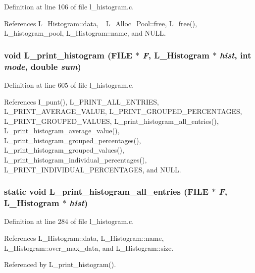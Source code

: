 Definition at line 106 of file l\_\-histogram.c.

References L\_\-Histogram::data, \_\-L\_\-Alloc\_\-Pool::free, L\_\-free(), L\_\-histogram\_\-pool, L\_\-Histogram::name, and NULL.
\subsubsection{\setlength{\rightskip}{0pt plus 5cm}void L\_\-print\_\-histogram (FILE $\ast$ {\em F}, \bf{L\_\-Histogram} $\ast$ {\em hist}, int {\em mode}, double {\em sum})}\label{l__histogram_8c_d6f17fb66a8bca281cb50d0a9778647e}




Definition at line 605 of file l\_\-histogram.c.

References I\_\-punt(), L\_\-PRINT\_\-ALL\_\-ENTRIES, L\_\-PRINT\_\-AVERAGE\_\-VALUE, L\_\-PRINT\_\-GROUPED\_\-PERCENTAGES, L\_\-PRINT\_\-GROUPED\_\-VALUES, L\_\-print\_\-histogram\_\-all\_\-entries(), L\_\-print\_\-histogram\_\-average\_\-value(), L\_\-print\_\-histogram\_\-grouped\_\-percentages(), L\_\-print\_\-histogram\_\-grouped\_\-values(), L\_\-print\_\-histogram\_\-individual\_\-percentages(), L\_\-PRINT\_\-INDIVIDUAL\_\-PERCENTAGES, and NULL.
\subsubsection{\setlength{\rightskip}{0pt plus 5cm}static void L\_\-print\_\-histogram\_\-all\_\-entries (FILE $\ast$ {\em F}, \bf{L\_\-Histogram} $\ast$ {\em hist})\hspace{0.3cm}{\tt  [static]}}\label{l__histogram_8c_2e01f05ca006f2cee2f9be7bb3f4e02b}




Definition at line 284 of file l\_\-histogram.c.

References L\_\-Histogram::data, L\_\-Histogram::name, L\_\-Histogram::over\_\-max\_\-data, and L\_\-Histogram::size.

Referenced by L\_\-print\_\-histogram().
